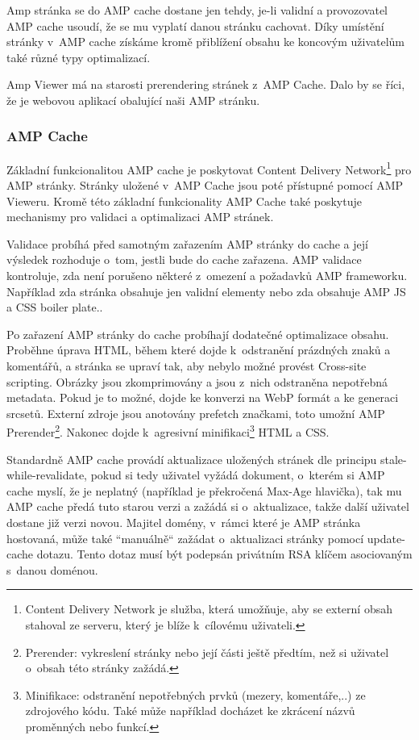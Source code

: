 Amp stránka se do AMP cache dostane jen tehdy, je-li validní a provozovatel AMP cache usoudí, že se mu vyplatí danou stránku cachovat. Díky umístění stránky v~AMP cache získáme kromě přiblížení obsahu ke koncovým uživatelům také různé typy optimalizací.

Amp Viewer má na starosti prerendering stránek z~AMP Cache. Dalo by se říci, že je webovou aplikací obalující naši AMP stránku. 

\subsubsection*{AMP Cache}
Základní funkcionalitou AMP cache je poskytovat Content Delivery Network\footnote{Content Delivery Network je služba, která umožňuje, aby se externí obsah stahoval ze serveru, který je blíže k~cílovému uživateli.} pro AMP stránky. Stránky uložené v~AMP Cache jsou poté přístupné pomocí AMP Vieweru.
Kromě této základní funkcionality AMP Cache také poskytuje mechanismy pro validaci a optimalizaci AMP stránek.

Validace probíhá před samotným zařazením AMP stránky do cache a její výsledek rozhoduje o~tom, jestli bude do cache zařazena.
AMP validace kontroluje, zda není porušeno některé z~omezení a požadavků AMP frameworku. Například zda stránka obsahuje jen validní elementy nebo zda obsahuje AMP JS a CSS boiler plate.\cite{AMPCache}.

Po zařazení AMP stránky do cache probíhají dodatečné optimalizace obsahu.
Proběhne úprava HTML, během které dojde k~odstranění prázdných znaků a komentářů, a stránka se upraví tak, aby nebylo možné provést Cross-site scripting\cite{whyAMPCache}.
Obrázky jsou zkomprimovány a jsou z~nich odstraněna nepotřebná metadata. Pokud je to možné, dojde ke konverzi na WebP formát a ke generaci srcsetů.
Externí zdroje jsou anotovány prefetch značkami, toto umožní AMP Prerender\footnote{Prerender: vykreslení stránky nebo její části ještě předtím, než si uživatel o~obsah této stránky zažádá.}.
Nakonec dojde k~agresivní minifikaci\footnote{Minifikace: odstranění nepotřebných prvků (mezery, komentáře,..) ze zdrojového kódu. Také může například docházet ke zkrácení názvů proměnných nebo funkcí.} HTML a CSS.

Standardně AMP cache provádí aktualizace uložených stránek dle principu stale-while-revalidate, pokud si tedy uživatel vyžádá dokument, o~kterém si AMP cache myslí, že je neplatný (například  je překročená Max-Age hlavička), tak mu AMP cache předá tuto starou verzi a zažádá si o~aktualizace, takže další uživatel dostane již verzi novou\cite{AMPUpdate}.
Majitel domény, v~rámci které je AMP stránka hostovaná, může také “manuálně“ zažádat o~aktualizaci stránky pomocí update-cache dotazu. Tento dotaz musí být podepsán privátním RSA klíčem asociovaným s~danou doménou\cite{AMPUpdateUrl}.

